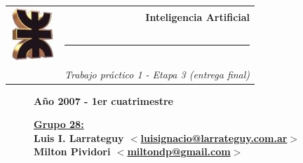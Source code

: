 \thispagestyle{empty}

\begin{center}
\begin{tabular}{cr}
\multirow{3}{*}{ \includegraphics{logoUTN.jpg} }
& \Huge\bfseries Inteligencia Artificial \\
& \noindent\rule[-1ex]{120mm}{4pt} \\
& \\
& \noindent\large\emph{Trabajo práctico 1 - Etapa 3 (entrega final)}
\end{tabular}
\end{center}

\begin{figure}[b]
\center\large\textbf{Año 2007 - 1er cuatrimestre}
\normalsize
\linebreak
\begin{flushleft}
\bfseries
\underline{Grupo 28:}\\
Luis I. Larrateguy \href{mailto:luisignacio@larrateguy.com.ar}
  {$<$luisignacio@larrateguy.com.ar$>$}
Milton Pividori \href{mailto:miltondp@gmail.com}
  {$<$miltondp@gmail.com$>$}\\
\end{flushleft}

\end{figure}
